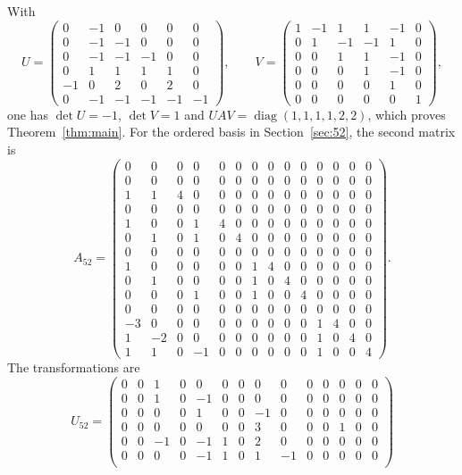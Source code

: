 \documentclass[11pt]{article}
\theoremstyle{remark}
\begin{document}
\begin{appendices}
With
\[
U=\begin{pmatrix}
 0&-1& 0& 0& 0& 0\\
 0&-1&-1& 0& 0& 0\\
 0&-1&-1&-1& 0& 0\\
 0& 1& 1& 1& 1& 0\\
-1& 0& 2& 0& 2& 0\\
 0&-1&-1&-1&-1&-1
\end{pmatrix},\qquad
V=\begin{pmatrix}
 1&-1& 1& 1&-1& 0\\
 0& 1&-1&-1& 1& 0\\
 0& 0& 1& 1&-1& 0\\
 0& 0& 0& 1&-1& 0\\
 0& 0& 0& 0& 1& 0\\
 0& 0& 0& 0& 0& 1
\end{pmatrix},
\]
one has $\det U=-1$, $\det V=1$ and $UAV=\operatorname{diag}(1,1,1,1,2,2)$,
which proves Theorem~\ref{thm:main}. For the ordered basis in Section~\ref{sec:52}, the second matrix is
\[
A_{52}=\begin{pmatrix}
0&0&0&0&0&0&0&0&0&0&0&0&0&0\\
0&0&0&0&0&0&0&0&0&0&0&0&0&0\\
1&1&4&0&0&0&0&0&0&0&0&0&0&0\\
0&0&0&0&0&0&0&0&0&0&0&0&0&0\\
1&0&0&1&4&0&0&0&0&0&0&0&0&0\\
0&1&0&1&0&4&0&0&0&0&0&0&0&0\\
0&0&0&0&0&0&0&0&0&0&0&0&0&0\\
1&0&0&0&0&0&1&4&0&0&0&0&0&0\\
0&1&0&0&0&0&1&0&4&0&0&0&0&0\\
0&0&0&1&0&0&1&0&0&4&0&0&0&0\\
0&0&0&0&0&0&0&0&0&0&0&0&0&0\\
-3&0&0&0&0&0&0&0&0&0&1&4&0&0\\
1&-2&0&0&0&0&0&0&0&0&1&0&4&0\\
1&1&0&-1&0&0&0&0&0&0&1&0&0&4
\end{pmatrix}.
\]
The transformations are
\[
U_{52}=\begin{pmatrix}
0&0&1&0&0&0&0&0&0&0&0&0&0&0\\
0&0&1&0&-1&0&0&0&0&0&0&0&0&0\\
0&0&0&0&1&0&0&-1&0&0&0&0&0&0\\
0&0&0&0&0&0&0&3&0&0&0&1&0&0\\
0&0&-1&0&-1&1&0&2&0&0&0&0&0&0\\
0&0&0&0&-1&1&0&1&-1&0&0&0&0&0\\

\end{pmatrix}\]
\end{appendices}
\end{document}
